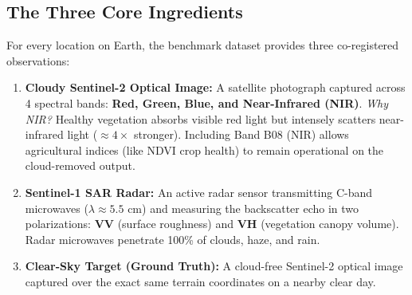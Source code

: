 \documentclass[11pt,a4paper]{article}
\begin{document}
\subsection{The Three Core Ingredients}
For every location on Earth, the benchmark dataset provides three co-registered observations:
\begin{enumerate}[leftmargin=1.5em]
    \item \textbf{Cloudy Sentinel-2 Optical Image:} A satellite photograph captured across 4 spectral bands: \textbf{Red, Green, Blue, and Near-Infrared (NIR)}.
    \textit{Why NIR?} Healthy vegetation absorbs visible red light but intensely scatters near-infrared light ($\approx 4\times$ stronger). Including Band B08 (NIR) allows agricultural indices (like NDVI crop health) to remain operational on the cloud-removed output.
    \item \textbf{Sentinel-1 SAR Radar:} An active radar sensor transmitting C-band microwaves ($\lambda \approx 5.5\text{ cm}$) and measuring the backscatter echo in two polarizations: \textbf{VV} (surface roughness) and \textbf{VH} (vegetation canopy volume). Radar microwaves penetrate 100\% of clouds, haze, and rain.
    \item \textbf{Clear-Sky Target (Ground Truth):} A cloud-free Sentinel-2 optical image captured over the exact same terrain coordinates on a nearby clear day.
\end{enumerate}
\end{document}
